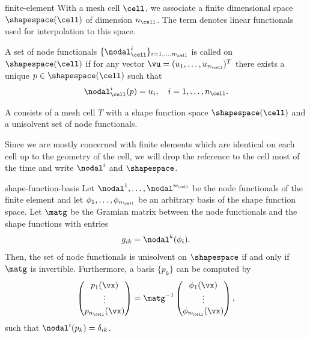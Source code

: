 \begin{Definition}{finite-element}
  With a mesh cell $\cell$, we associate a finite dimensional
   space $\shapespace(\cell)$ of dimension
  $n_\cell$. The term  denotes linear
  functionals used for interpolation to this space.

  A set of node functionals $\{\nodal_\cell^i\}_{i=1,\dots,n_\cell}$ is called
   on $\shapespace(\cell)$ if for any vector
  $\vu = (u_1,\dots,u_{n_\cell})^T$ there exists a unique
  $p\in \shapespace(\cell)$ such that
  \begin{gather}
    \nodal_\cell^i(p) = u_i,\quad i=1,\dots,n_\cell.
  \end{gather}

  A  consists of a mesh cell $T$ with a shape
  function space $\shapespace(\cell)$ and a unisolvent set of node
  functionals.
\end{Definition}

\begin{intro}
  Since we are mostly concerned with finite elements which are
  identical on each cell up to the geometry of the cell, we will drop
  the reference to the cell most of the time and write $\nodal^i$ and
  $\shapespace$.
\end{intro}

\begin{Lemma}{shape-function-basis}
  Let $\nodal^1,\dots,\nodal^{n_{\cell}}$ be the node functionals of the
  finite element and let $\phi_1,\dots,\phi_{n_{\cell}}$ be an arbitrary
  basis of the shape function space.  Let $\matg$ be the Gramian matrix
  between the node functionals and the shape functions with entries
  \begin{gather}
    g_{ik} = \nodal^k(\phi_i).
  \end{gather}
  Then, the set of node functionals is unisolvent on $\shapespace$ if
  and only if $\matg$ is invertible. Furthermore, a
  basis $\{p_k\}$ can be computed by
  \begin{gather}
    \begin{pmatrix}
      p_1(\vx)\\\vdots\\p_{n_{\cell}}(\vx)
    \end{pmatrix}
    = \matg^{-1}
    \begin{pmatrix}
      \phi_1(\vx)\\\vdots\\\phi_{n_{\cell}}(\vx)
    \end{pmatrix},
  \end{gather}
  such that $\nodal^i(p_k) = \delta_{ik}$.
\end{Lemma}

